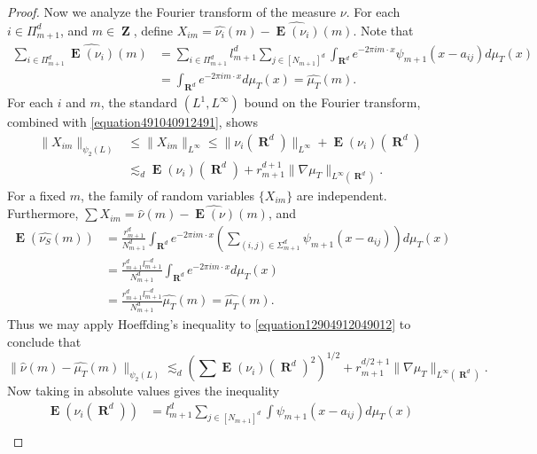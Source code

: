 \documentclass[12pt,reqno]{amsart}
\DeclareMathOperator{\RR}{\mathbf{R}}
\DeclareMathOperator{\ZZ}{\mathbf{Z}}
\DeclareMathOperator{\EE}{\mathbf{E}}
\newcommand{\psitwo}[1]{\| {#1} \|_{\psi_2(L)}}
\begin{document}
\begin{proof}
    Now we analyze the Fourier transform of the measure $\nu$. For each $i \in \Pi_{m+1}^d$, and $m \in \ZZ$, define $X_{im} = \widehat{\nu_i}(m) - \widehat{\EE(\nu_i)}(m)$. Note that
    \begin{equation} \label{equation891248921894128942189}
    \begin{split}
        \sum_{i \in \Pi_{m+1}^d} \widehat{\EE(\nu_i)}(m) &= \sum_{i \in \Pi_{m+1}^d} l_{m+1}^d \sum_{j \in [N_{m+1}]^d} \int_{\RR^d} e^{- 2 \pi i m \cdot x} \psi_{m+1}(x - a_{ij}) d\mu_T(x)\\
        &= \int_{\RR^d} e^{-2 \pi i m \cdot x} d\mu_T(x) = \widehat{\mu_T}(m).
    \end{split}
    \end{equation}
    For each $i$ and $m$, the standard $(L^1,L^\infty)$ bound on the Fourier transform, combined with \eqref{equation491040912491}, shows
    \begin{equation} \label{equation12904912049012}
    \begin{split}
        \psitwo{X_{im}} &\leq \| X_{im} \|_{L^\infty} \leq \| \nu_i(\RR^d) \|_{L^\infty} + \EE(\nu_i)(\RR^d)\\
        &\lesssim_d \EE(\nu_i)(\RR^d) + r_{m+1}^{d+1} \| \nabla \mu_T \|_{L^\infty(\RR^d)}.
    \end{split}
    \end{equation}
    For a fixed $m$, the family of random variables $\{ X_{im} \}$ are independent. Furthermore, $\sum X_{im} = \widehat{\nu}(m) - \widehat{\EE(\nu)}(m)$, and
    \begin{align*}
        \EE(\widehat{\nu_S}(m)) &= \frac{r_{m+1}^d}{N_{m+1}^d} \int_{\RR^d} e^{-2 \pi i m \cdot x} \left( \sum_{(i,j) \in \Sigma_{m+1}^d} \psi_{m+1}(x - a_{ij}) \right) d\mu_T(x)\\
        &= \frac{r_{m+1}^d l_{m+1}^{-d}}{N_{m+1}^d} \int_{\RR^d} e^{-2 \pi i m \cdot x} d\mu_T(x)\\
        &= \frac{r_{m+1}^d l_{m+1}^{-d}}{N_{m+1}^d} \widehat{\mu_T}(m) = \widehat{\mu_T}(m).
    \end{align*}
    Thus we may apply Hoeffding's inequality to \eqref{equation12904912049012} to conclude that
    \[ \psitwo{\widehat{\nu}(m) - \widehat{\mu_T}(m)} \lesssim_d \left( \sum \EE(\nu_i)(\RR^d)^2 \right)^{1/2} + r_{m+1}^{d/2+1} \| \nabla \mu_T \|_{L^\infty(\RR^d)}. \]
    Now taking in absolute values gives the inequality
    \begin{align*}
        \EE(\nu_i(\RR^d)) &= l_{m+1}^d \sum_{j \in [N_{m+1}]^d} \int \psi_{m+1}(x - a_{ij}) d\mu_T(x)\\

\end{align*}
\end{proof}
\end{document}
